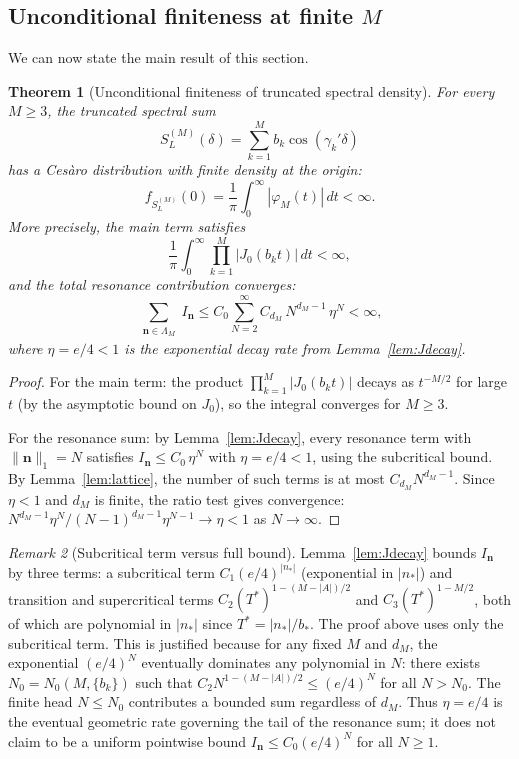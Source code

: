 \documentclass[12pt,reqno]{amsart}
\theoremstyle{plain}
\newtheorem{theorem}{Theorem}[section]
\theoremstyle{definition}
\theoremstyle{remark}
\newtheorem{remark}[theorem]{Remark}
\begin{document}
\subsection{Unconditional finiteness at finite \texorpdfstring{$M$}{M}}

We can now state the main result of this section.

\begin{theorem}[Unconditional finiteness of truncated spectral density]\label{thm:finite}
For every $M \geq 3$, the truncated spectral sum
\[
  S_L^{(M)}(\delta) = \sum_{k=1}^M b_k\cos(\gamma_k'\delta)
\]
has a Ces\`aro distribution with finite density at the origin:
\[
  f_{S_L^{(M)}}(0) = \frac{1}{\pi}\int_0^\infty |\varphi_M(t)|\, dt < \infty.
\]
More precisely, the main term satisfies
\[
  \frac{1}{\pi}\int_0^\infty \prod_{k=1}^M |J_0(b_k t)|\, dt < \infty,
\]
and the total resonance contribution converges:
\[
  \sum_{\substack{\mathbf{n} \in \Lambda_M}} I_{\mathbf{n}} \leq C_0 \sum_{N=2}^{\infty} C_{d_M}\, N^{d_M-1}\, \eta^N < \infty,
\]
where $\eta = e/4 < 1$ is the exponential decay rate from Lemma~\ref{lem:Jdecay}.
\end{theorem}

\begin{proof}
For the main term: the product $\prod_{k=1}^M |J_0(b_k t)|$ decays as $t^{-M/2}$ for large $t$ (by the asymptotic bound on $J_0$), so the integral converges for $M \geq 3$.

For the resonance sum: by Lemma~\ref{lem:Jdecay}, every resonance term with $\|\mathbf{n}\|_1 = N$ satisfies $I_{\mathbf{n}} \leq C_0\, \eta^N$ with $\eta = e/4 < 1$, using the subcritical bound.  By Lemma~\ref{lem:lattice}, the number of such terms is at most $C_{d_M} N^{d_M - 1}$.  Since $\eta < 1$ and $d_M$ is finite, the ratio test gives convergence: $N^{d_M-1}\eta^N / (N-1)^{d_M-1}\eta^{N-1} \to \eta < 1$ as $N \to \infty$.
\end{proof}

\begin{remark}[Subcritical term versus full bound]\label{rem:subcrit-dominance}
Lemma~\ref{lem:Jdecay} bounds $I_{\mathbf{n}}$ by three terms: a subcritical term $C_1(e/4)^{|n_*|}$ (exponential in $|n_*|$) and transition and supercritical terms $C_2(T^*)^{1-(M-|A|)/2}$ and $C_3(T^*)^{1-M/2}$, both of which are polynomial in $|n_*|$ since $T^* = |n_*|/b_*$.  The proof above uses only the subcritical term.  This is justified because for any fixed $M$ and $d_M$, the exponential $(e/4)^N$ eventually dominates any polynomial in $N$: there exists $N_0 = N_0(M, \{b_k\})$ such that $C_2 N^{1-(M-|A|)/2} \leq (e/4)^N$ for all $N > N_0$.  The finite head $N \leq N_0$ contributes a bounded sum regardless of $d_M$.  Thus $\eta = e/4$ is the eventual geometric rate governing the tail of the resonance sum; it does not claim to be a uniform pointwise bound $I_{\mathbf{n}} \leq C_0(e/4)^N$ for all $N \geq 1$.
\end{remark}
\end{document}
